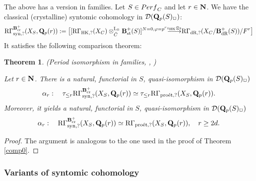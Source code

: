 \documentclass[10pt,reqno]{amsart}
\newtheorem{theorem}[equation]{Theorem}
\theoremstyle{definition}
\theoremstyle{remark}
\def\lomapr#1{\smash{\mathop{\relbar\joinrel\longrightarrow}\limits^{#1}}}
\def\phi{\varphi}
\newcommand{\dr}{\operatorname{dR} }
\newcommand{\proeet}{\operatorname{pro\acute{e}t} }
\newcommand{\synt}{ \operatorname{syn} }
\newcommand{\st}{\operatorname{st} }
\newcommand{\crr}{\operatorname{cr} }
\newcommand{\hk}{\operatorname{HK} }
\newcommand{\LL}{\operatorname{L} }
\newcommand{\sd}{{\mathcal{D}}}
\numberwithin{equation}{section}
\def\R{{\mathrm R}}
\def\Q{{\bf Q}} \def\Z{{\bf Z}}
\def\N{{\bf N}}
\numberwithin{equation}{section}
\begin{document}
   The above has a version in families. Let $S\in{\rm Perf}_C$ and  let $r\in\N$.  We have  the classical (crystalline) syntomic cohomology in $\sd(\Q_{p}(S)_{\Box})$: 
 \begin{equation}\label{kawa2}
 \R\Gamma^{\B_{\crr}^+}_{\synt,?}(X_{S},\Q_p(r))
:=\big[[\R\Gamma_{\hk,?}(X_C)\otimes^{\LL_{\Box}}_{\breve{C}}\B^+_{\st}(S)]^{N=0,\phi=p^r}\lomapr{\iota_{\hk}\otimes\iota}\R\Gamma_{\dr,?}(X_C/\B_{\dr}^+(S))/F^r\big]
 \end{equation}
 It satisfies the following comparison theorem:
  \begin{theorem}\label{comp01}
{\rm(Period isomorphism in families, \cite[Cor. 7.37]{CN4}, \cite[Prop.\,6.16]{AGN})}

Let $r\in\N$. There is a natural, functorial in $S$,   quasi-isomorphism in $\sd(\Q_{p}(S)_{\Box})$
 \begin{equation}\label{tea2}
\alpha_r: \quad  \tau_{\leq r}\R\Gamma^{\B_{\crr}^+}_{\synt,?}(X_S,\Q_p(r))\simeq \tau_{\leq r}\R\Gamma_{\proeet,?}(X_S,\Q_p(r)).
 \end{equation}
 Moreover, it yields  a  natural, functorial in  $S$,   quasi-isomorphism in $\sd(\Q_{p}(S)_{\Box})$
 \begin{align*}
  \alpha_r:\quad  \R\Gamma^{\B_{\crr}^+}_{\synt,?}(X_S,\Q_p(r))  \simeq \R\Gamma_{\proeet,?}(X_S,\Q_p(r)),\quad r\geq 2d.
\end{align*}
 \end{theorem}
\begin{proof}  
The argument is analogous to the one used in the proof of Theorem \ref{comp0}.
\end{proof}
\subsubsection{Variants of syntomic cohomology}
\end{document}
